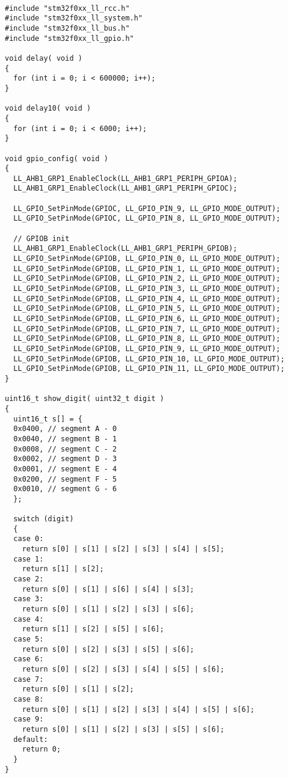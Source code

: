 \begin{verbatim}
    
#include "stm32f0xx_ll_rcc.h"
#include "stm32f0xx_ll_system.h"
#include "stm32f0xx_ll_bus.h"
#include "stm32f0xx_ll_gpio.h"

void delay( void )
{
  for (int i = 0; i < 600000; i++);
}

void delay10( void )
{
  for (int i = 0; i < 6000; i++);
}

void gpio_config( void )
{
  LL_AHB1_GRP1_EnableClock(LL_AHB1_GRP1_PERIPH_GPIOA);
  LL_AHB1_GRP1_EnableClock(LL_AHB1_GRP1_PERIPH_GPIOC);
  
  LL_GPIO_SetPinMode(GPIOC, LL_GPIO_PIN_9, LL_GPIO_MODE_OUTPUT);
  LL_GPIO_SetPinMode(GPIOC, LL_GPIO_PIN_8, LL_GPIO_MODE_OUTPUT);
  
  // GPIOB init
  LL_AHB1_GRP1_EnableClock(LL_AHB1_GRP1_PERIPH_GPIOB);
  LL_GPIO_SetPinMode(GPIOB, LL_GPIO_PIN_0, LL_GPIO_MODE_OUTPUT);
  LL_GPIO_SetPinMode(GPIOB, LL_GPIO_PIN_1, LL_GPIO_MODE_OUTPUT);
  LL_GPIO_SetPinMode(GPIOB, LL_GPIO_PIN_2, LL_GPIO_MODE_OUTPUT);
  LL_GPIO_SetPinMode(GPIOB, LL_GPIO_PIN_3, LL_GPIO_MODE_OUTPUT);
  LL_GPIO_SetPinMode(GPIOB, LL_GPIO_PIN_4, LL_GPIO_MODE_OUTPUT);
  LL_GPIO_SetPinMode(GPIOB, LL_GPIO_PIN_5, LL_GPIO_MODE_OUTPUT);
  LL_GPIO_SetPinMode(GPIOB, LL_GPIO_PIN_6, LL_GPIO_MODE_OUTPUT);
  LL_GPIO_SetPinMode(GPIOB, LL_GPIO_PIN_7, LL_GPIO_MODE_OUTPUT);
  LL_GPIO_SetPinMode(GPIOB, LL_GPIO_PIN_8, LL_GPIO_MODE_OUTPUT);
  LL_GPIO_SetPinMode(GPIOB, LL_GPIO_PIN_9, LL_GPIO_MODE_OUTPUT);
  LL_GPIO_SetPinMode(GPIOB, LL_GPIO_PIN_10, LL_GPIO_MODE_OUTPUT);
  LL_GPIO_SetPinMode(GPIOB, LL_GPIO_PIN_11, LL_GPIO_MODE_OUTPUT);
}

uint16_t show_digit( uint32_t digit )
{
  uint16_t s[] = {
  0x0400, // segment A - 0
  0x0040, // segment B - 1
  0x0008, // segment C - 2
  0x0002, // segment D - 3
  0x0001, // segment E - 4
  0x0200, // segment F - 5
  0x0010, // segment G - 6
  };
  
  switch (digit)
  {
  case 0:
    return s[0] | s[1] | s[2] | s[3] | s[4] | s[5];
  case 1:
    return s[1] | s[2];
  case 2:
    return s[0] | s[1] | s[6] | s[4] | s[3];
  case 3:
    return s[0] | s[1] | s[2] | s[3] | s[6];
  case 4:
    return s[1] | s[2] | s[5] | s[6];
  case 5:
    return s[0] | s[2] | s[3] | s[5] | s[6];
  case 6:
    return s[0] | s[2] | s[3] | s[4] | s[5] | s[6];
  case 7:
    return s[0] | s[1] | s[2];
  case 8:
    return s[0] | s[1] | s[2] | s[3] | s[4] | s[5] | s[6];
  case 9:
    return s[0] | s[1] | s[2] | s[3] | s[5] | s[6];
  default:
    return 0;
  }
}


\end{verbatim}
